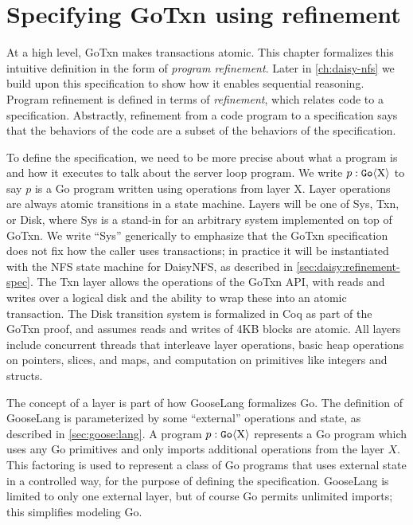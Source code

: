 \section{Specifying GoTxn using refinement}%
\label{sec:txn:spec}

At a high level, GoTxn makes transactions atomic. This chapter formalizes this
intuitive definition in the form of \emph{program refinement}. Later in
\cref{ch:daisy-nfs} we build upon this specification to show how it enables
sequential reasoning. Program refinement is defined in terms of
\emph{refinement}, which relates code to a specification. Abstractly, refinement
from a code program to a specification says that the behaviors of the code are a
subset of the behaviors of the specification.

To define the specification, we need to be more precise about what a program is
and how it executes to talk about the server loop program. We
write $p : \mathtt{Go}\langle \mathrm{X} \rangle$ to say $p$ is a Go program written using operations
from layer X.
Layer operations are always atomic transitions in a state machine. Layers will
be one of Sys, Txn, or Disk, where Sys is a
stand-in for an arbitrary system implemented on top of GoTxn. We write
``Sys'' generically to emphasize that the GoTxn specification does not fix how the
caller uses transactions; in practice it will be instantiated with the NFS state
machine for DaisyNFS, as described in \cref{sec:daisy:refinement-spec}.
The Txn layer allows the operations of the GoTxn API, with reads and writes over a logical
disk and the ability to wrap these into an atomic transaction. The
Disk transition system is formalized in Coq as part of the GoTxn proof,
and assumes reads and writes of 4KB blocks are atomic. All layers
include concurrent threads that interleave layer
operations, basic heap operations on pointers, slices, and maps, and computation
on primitives like integers and structs.

The concept of a layer is part of how GooseLang formalizes Go. The definition of
GooseLang is parameterized by some ``external'' operations and state, as
described in \cref{sec:goose:lang}. A program $p : \mathtt{Go}\langle \mathrm{X} \rangle$ represents a
Go program which uses any Go primitives and only imports additional operations
from the layer $X$. This factoring is used to represent a class of Go programs
that uses external state in a controlled way, for the purpose of defining the
specification. GooseLang is limited to only one external layer, but of course Go
permits unlimited imports; this simplifies modeling Go.


